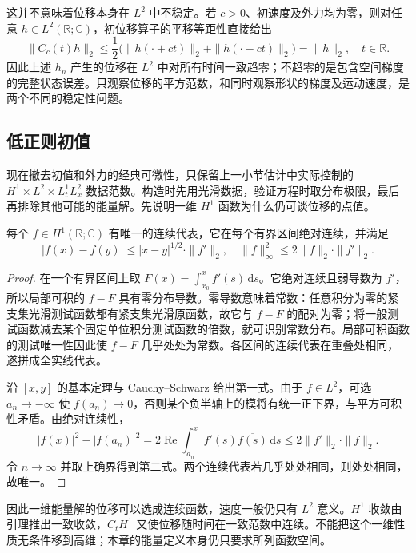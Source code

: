 \ProseParagraphBreak

这并不意味着位移本身在 \(L^2\) 中不稳定。若 \(c>0\)、初速度及外力均为零，则对任意 \(h\in L^2(\mathbb R;\mathbb C)\)，初位移算子的平移等距性直接给出
\[
 \|C_c(t)h\|_2\leq\frac12\bigl(\|h(\cdot+ct)\|_2+\|h(\cdot-ct)\|_2\bigr)=\|h\|_2,
 \quad t\in\mathbb R.
\]
因此上述 \(h_n\) 产生的位移在 \(L^2\) 中对所有时间一致趋零；不趋零的是包含空间梯度的完整状态误差。只观察位移的平方范数，和同时观察形状的梯度及运动速度，是两个不同的稳定性问题。

\subsection{低正则初值}
\label{b2:subsec:090304}

现在撤去初值和外力的经典可微性，只保留上一小节估计中实际控制的 \(H^1\times L^2\times L^1_tL^2_x\) 数据范数。构造时先用光滑数据，验证方程时取分布极限，最后再排除其他可能的能量解。先说明一维 \(H^1\) 函数为什么仍可谈位移的点值。

\begin{lemma}[一维位移的连续代表]\label{b2:lem:09-h1-representative}
每个 \(f\in H^1(\mathbb R;\mathbb C)\) 有唯一的连续代表，它在每个有界区间绝对连续，并满足
\[
 |f(x)-f(y)|\leq|x-y|^{1/2}\cdot\|f'\|_2,
 \quad\|f\|_\infty^2\leq2\|f\|_2\cdot\|f'\|_2.
\]
\end{lemma}
\begin{proof}
在一个有界区间上取 \(F(x)=\int_{x_0}^xf'(s)\,\mathrm{d}s\)。它绝对连续且弱导数为 \(f'\)，所以局部可积的 \(f-F\) 具有零分布导数。零导数意味着常数：任意积分为零的紧支集光滑测试函数都有紧支集光滑原函数，故它与 \(f-F\) 的配对为零；将一般测试函数减去某个固定单位积分测试函数的倍数，就可识别常数分布。局部可积函数的测试唯一性因此使 \(f-F\) 几乎处处为常数。各区间的连续代表在重叠处相同，遂拼成全实线代表。

沿 \([x,y]\) 的基本定理与 Cauchy--Schwarz 给出第一式。由于 \(f\in L^2\)，可选 \(a_n\to-\infty\) 使 \(f(a_n)\to0\)，否则某个负半轴上的模将有统一正下界，与平方可积性矛盾。由绝对连续性，
\[
 |f(x)|^2-|f(a_n)|^2
 =2\operatorname{Re}\int_{a_n}^xf'(s)\overline{f(s)}\,\mathrm{d}s
 \leq2\|f'\|_2\cdot\|f\|_2.
\]
令 \(n\to\infty\) 并取上确界得到第二式。两个连续代表若几乎处处相同，则处处相同，故唯一。
\end{proof}

因此一维能量解的位移可以选成连续函数，速度一般仍只有 \(L^2\) 意义。\(H^1\) 收敛由引理推出一致收敛，\(C_tH^1\) 又使位移随时间在一致范数中连续。不能把这个一维性质无条件移到高维；本章的能量定义本身仍只要求所列函数空间。

